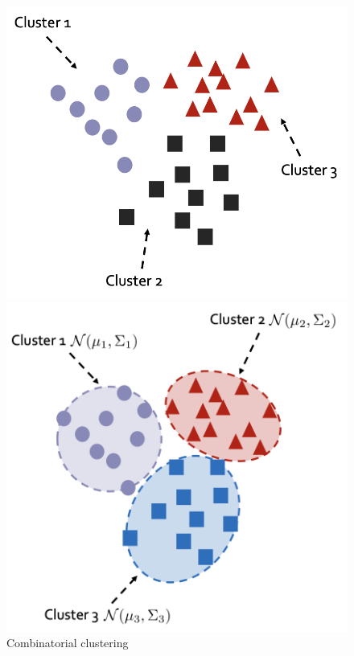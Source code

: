 \begin{figure}
    \centering
    \begin{minipage}{0.45\textwidth}
        \centering
        \includegraphics[width=\linewidth]{./figures/chapter_7/combinatorial.png}
        \caption{Combinatorial clustering}
        \label{fig:combex}
    \end{minipage}
    \hfill
    \begin{minipage}{0.45\textwidth}
        \centering
        \includegraphics[width=\linewidth]{./figures/chapter_7/distribution.png}

\end{minipage}
\end{figure}
